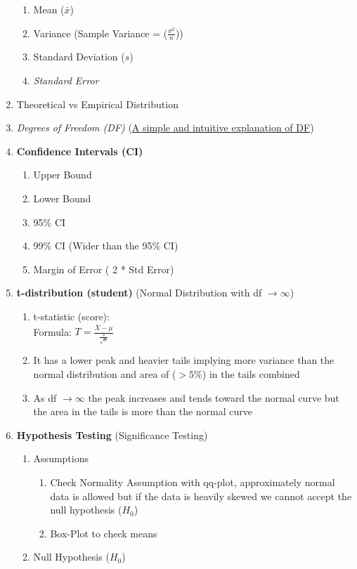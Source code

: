 \documentclass[11pt]{article}
\begin{document}
\begin{enumerate}
\begin{enumerate}
			\item Mean ($\bar{x}$)
			\item Variance (Sample Variance = ($ \frac{\sigma^2}{n} $))
			\item Standard Deviation ($s$)
			\item \textit{Standard Error}
		\end{enumerate}
		\item Theoretical vs Empirical Distribution
		\item \textit{Degrees of Freedom (DF)} (\href{https://www.youtube.com/watch?v=rATNoxKg1yA}{A simple and intuitive explanation of DF})
		\item \textbf{Confidence Intervals (CI)}
		\begin{enumerate}
			\item Upper Bound
			\item Lower Bound
			\item 95\% CI
			\item 99\% CI (Wider than the 95\% CI)
			\item Margin of Error ( 2 * Std Error)
		\end{enumerate}
		\item \textbf{t-distribution (student)} (Normal Distribution with df $ \to \infty$)
		\begin{enumerate}
			\item t-statistic (score):\\
			Formula: 
			$T = \frac{ \bar{X} - \mu}{ \frac{s}{\sqrt{n}} }$
			\item It has a lower peak and heavier tails implying more variance than the normal distribution and area of ($> 5\%$) in the tails combined
			\item As df $\to \infty$ the peak increases and tends toward the normal curve but the area in the tails is more than the normal curve
		\end{enumerate}
		\item \textbf{Hypothesis Testing} (Significance Testing)
		\begin{enumerate}
			\item Assumptions
			\begin{enumerate}
				\item Check Normality Assumption with qq-plot, approximately normal data is allowed but if the data is heavily skewed we cannot accept the null hypothesis ($H_0$)
				\item Box-Plot to check means
			\end{enumerate}
			\item Null Hypothesis ($H_0$) 

\end{enumerate}
\end{enumerate}
\end{document}
